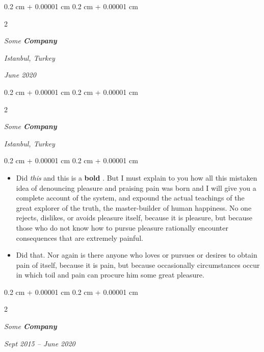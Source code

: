 \documentclass[10pt, letterpaper]{article}
\newenvironment{highlights}{
    \begin{itemize}[
        topsep=0.10 cm,
        parsep=0.10 cm,
        partopsep=0pt,
        itemsep=0pt,
        leftmargin=0.4 cm + 10pt
    ]
}{
    \end{itemize}
} %
\newenvironment{onecolentry}{
    \begin{adjustwidth}{
        0.2 cm + 0.00001 cm
    }{
        0.2 cm + 0.00001 cm
    }
}{
    \end{adjustwidth}
} %
\newenvironment{twocolentry}[2][]{
    \onecolentry
    \def\secondColumn{#2}
    \setcolumnwidth{\fill, 4.5 cm}
    \begin{paracol}{2}
}{
    \switchcolumn \raggedleft \secondColumn
    \end{paracol}
    \endonecolentry
} %
\let\hrefWithoutArrow\href
\renewcommand{\href}[2]{\hrefWithoutArrow{#1}{\ifthenelse{\equal{#2}{}}{ }{#2 }\raisebox{.15ex}{\footnotesize \faExternalLink*}}}
\begin{document}
        \vspace{0.2 cm}

            \begin{twocolentry}{
        \textit{Istanbul, Turkey}

        \textit{June 2020}    }
                \textbf{}

                \textit{Some \textbf{Company}}
            \end{twocolentry}



        \vspace{0.2 cm}

            \begin{twocolentry}{
        \textit{Istanbul, Turkey}

            }
                \textbf{}

                \textit{Some \textbf{Company}}
            \end{twocolentry}

        \vspace{0.10 cm}
        \begin{onecolentry}
            \begin{highlights}
                \item Did \textit{this} and this is a \textbf{bold} \href{https://example.com}{link}. But I must explain to you how all this mistaken idea of denouncing pleasure and praising pain was born and I will give you a complete account of the system, and expound the actual teachings of the great explorer of the truth, the master-builder of human happiness. No one rejects, dislikes, or avoids pleasure itself, because it is pleasure, but because those who do not know how to pursue pleasure rationally encounter consequences that are extremely painful.
                \item Did that. Nor again is there anyone who loves or pursues or desires to obtain pain of itself, because it is pain, but because occasionally circumstances occur in which toil and pain can procure him some great pleasure.
            \end{highlights}
        \end{onecolentry}


        \vspace{0.2 cm}

            \begin{twocolentry}{


        \textit{Sept 2015 – June 2020}    }
                \textbf{}

                \textit{Some \textbf{Company}}
            \end{twocolentry}
\end{document}
